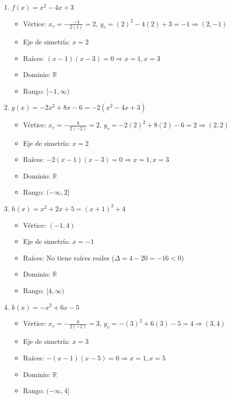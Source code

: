 \documentclass[12pt,a4paper]{article}
\begin{document}
\begin{enumerate}
    \item $f(x) = x^2 - 4x + 3$
    \begin{itemize}
        \item Vértice: $x_v = -\frac{-4}{2(1)} = 2$, $y_v = (2)^2 - 4(2) + 3 = -1 \Rightarrow (2, -1)$
        \item Eje de simetría: $x = 2$
        \item Raíces: $(x - 1)(x - 3) = 0 \Rightarrow x = 1, x = 3$
        \item Dominio: $\mathbb{R}$
        \item Rango: $[-1, \infty)$
    \end{itemize}
    
    \item $g(x) = -2x^2 + 8x - 6 = -2(x^2 - 4x + 3)$
    \begin{itemize}
        \item Vértice: $x_v = -\frac{8}{2(-2)} = 2$, $y_v = -2(2)^2 + 8(2) - 6 = 2 \Rightarrow (2, 2)$
        \item Eje de simetría: $x = 2$
        \item Raíces: $-2(x - 1)(x - 3) = 0 \Rightarrow x = 1, x = 3$
        \item Dominio: $\mathbb{R}$
        \item Rango: $(-\infty, 2]$
    \end{itemize}
    
    \item $h(x) = x^2 + 2x + 5 = (x + 1)^2 + 4$
    \begin{itemize}
        \item Vértice: $(-1, 4)$
        \item Eje de simetría: $x = -1$
        \item Raíces: No tiene raíces reales ($\Delta = 4 - 20 = -16 < 0$)
        \item Dominio: $\mathbb{R}$
        \item Rango: $[4, \infty)$
    \end{itemize}
    
    \item $k(x) = -x^2 + 6x - 5$
    \begin{itemize}
        \item Vértice: $x_v = -\frac{6}{2(-1)} = 3$, $y_v = -(3)^2 + 6(3) - 5 = 4 \Rightarrow (3, 4)$
        \item Eje de simetría: $x = 3$
        \item Raíces: $-(x - 1)(x - 5) = 0 \Rightarrow x = 1, x = 5$
        \item Dominio: $\mathbb{R}$
        \item Rango: $(-\infty, 4]$
    \end{itemize}
\end{enumerate}
\end{document}

